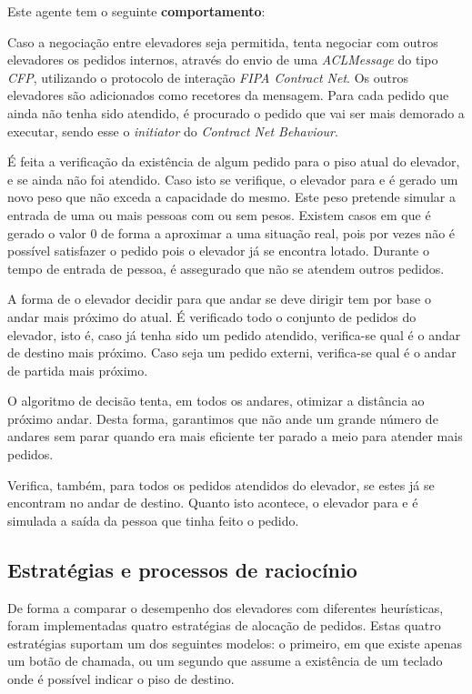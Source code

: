 \documentclass[a4paper]{article}
\begin{document}
Este agente tem o seguinte \textbf{comportamento}:

Caso a negociação entre elevadores seja permitida, tenta negociar com outros elevadores os pedidos internos, através do envio de uma \textit{ACLMessage} do tipo \textit{CFP}, utilizando o protocolo de interação \textit{FIPA Contract Net}. Os outros elevadores são adicionados como recetores da mensagem. Para cada pedido que ainda não tenha sido atendido, é procurado o pedido que vai ser mais demorado a executar, sendo esse o \textit{initiator} do \textit{Contract Net Behaviour}.

É feita a verificação da existência de algum pedido para o piso atual do elevador, e se ainda não foi atendido. Caso isto se verifique, o elevador para e é gerado um novo peso que não exceda a capacidade do mesmo. Este peso pretende simular a entrada de uma ou mais pessoas com ou sem pesos. Existem casos em que é gerado o valor 0 de forma a aproximar a uma situação real, pois por vezes não é possível satisfazer o pedido pois o elevador já se encontra lotado. Durante o tempo de entrada de pessoa, é assegurado que não se atendem outros pedidos.

A forma de o elevador decidir para que andar se deve dirigir tem por base o andar mais próximo do atual. É verificado todo o conjunto de pedidos do elevador, isto é, caso já tenha sido um pedido atendido, verifica-se qual é o andar de destino mais próximo. Caso seja um pedido externi, verifica-se qual é o andar de partida mais próximo.

O algoritmo de decisão tenta, em todos os andares, otimizar a distância ao próximo andar. Desta forma, garantimos que não ande um grande número de andares sem parar quando era mais eficiente ter parado a meio para atender mais pedidos.

Verifica, também, para todos os pedidos atendidos do elevador, se estes já se encontram no andar de destino. Quanto isto acontece, o elevador para e é simulada a saída da pessoa que tinha feito o pedido.

\subsection{Estratégias e processos de raciocínio} 

De forma a comparar o desempenho dos elevadores com diferentes heurísticas, foram implementadas quatro estratégias de alocação de pedidos. Estas quatro estratégias suportam um dos seguintes modelos: o primeiro, em que existe apenas um botão de chamada, ou um segundo que assume a existência de um teclado onde é possível indicar o piso de destino.
\end{document}
